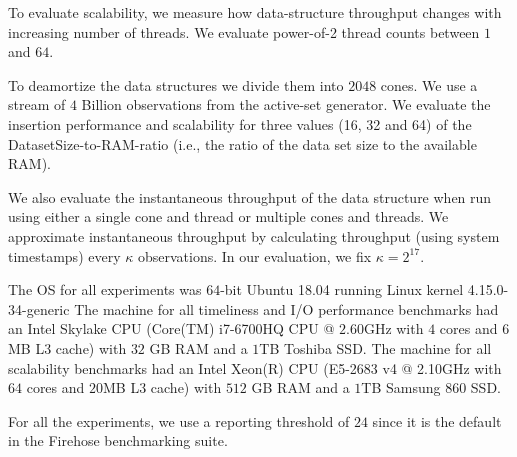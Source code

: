 To evaluate scalability, we measure how data-structure throughput
changes with increasing number of threads. We
evaluate power-of-2 thread counts between $1$ and $64$.

To deamortize the data structures we divide them into $2048$ cones. We use a
stream of $4$ Billion observations from the active-set generator.
We evaluate the
insertion performance and scalability for three values (16, 32 and 64) of the
DatasetSize-to-RAM-ratio (i.e., the ratio of the data set size to the available RAM).

 We also evaluate the
instantaneous throughput of the data structure when run using either a single cone and
thread or  multiple cones and threads. We approximate instantaneous throughput by
calculating throughput (using system timestamps) every $\kappa$ observations.
In our evaluation, we fix $\kappa = 2^{17}$.

 The OS for all experiments 
was $64$-bit Ubuntu 18.04 running Linux kernel 4.15.0-34-generic
%
The machine for all timeliness and I/O performance benchmarks 
had an Intel Skylake CPU (Core(TM) i7-6700HQ CPU @ $2.60$GHz with $4$ cores
and $6$MB L$3$ cache) with $32$ GB RAM and a $1$TB Toshiba SSD.
%
The machine for all scalability benchmarks had an Intel
Xeon(R) CPU (E5-2683 v4 @ 2.10GHz with $64$ cores and $20$MB L$3$ cache) with
$512$ GB RAM and a $1$TB Samsung $860$ SSD.

For all the experiments, we use a reporting threshold of $24$ since it is the default in the Firehose benchmarking suite.

